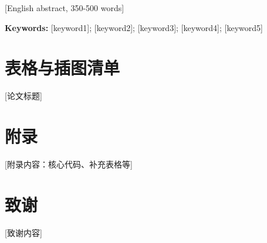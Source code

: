 ﻿\documentclass[UTF8,a4paper,zihao=-4,AutoFakeBold]{ctexart}
\newcommand{\fzxbsong}{\songti}
\begin{document}
[English abstract, 350-500 words]

\textbf{Keywords:} [keyword1]; [keyword2]; [keyword3]; [keyword4]; [keyword5]

\clearpage
\tableofcontents


\clearpage
\section*{\centering\heiti{} 表格与插图清单}
\listoftables
\listoffigures

\clearpage
\begin{center}
\fzxbsong\setlength{\baselineskip}{24pt}
[论文标题]
\end{center}











\section*{\centering\heiti{} 附录}

[附录内容：核心代码、补充表格等]

\section*{\centering\heiti{} 致谢}
\songti{}

[致谢内容]
\end{document}

